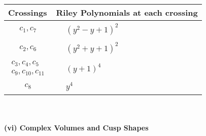 \documentclass[1p]{elsarticle_modified}
\theoremstyle{definition}
\begin{document}
\begin{tabular}{m{50pt}|m{274pt}}
Crossings & \hspace{64pt}Riley Polynomials at each crossing \\
\hline $$\begin{aligned}c_{1},c_{7}\end{aligned}$$&$\begin{aligned}
&(y^2- y+1)^2
\end{aligned}$\\
\hline $$\begin{aligned}c_{2},c_{6}\end{aligned}$$&$\begin{aligned}
&(y^2+y+1)^2
\end{aligned}$\\
\hline $$\begin{aligned}c_{3},c_{4},c_{5}\\c_{9},c_{10},c_{11}\end{aligned}$$&$\begin{aligned}
&(y+1)^4
\end{aligned}$\\
\hline $$\begin{aligned}c_{8}\end{aligned}$$&$\begin{aligned}
&y^4
\end{aligned}$\\
\hline
\end{tabular}\\~\\
\newpage\flushleft \textbf{(vi) Complex Volumes and Cusp Shapes}
\end{document}
